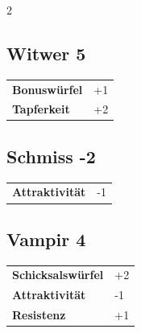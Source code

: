 \begin{multicols}{2}
\begin{tcolorbox}
    \subsection*{Witwer \hfill \small{5 }}
    \tcblower




\begin{tabular}{@{}ll@{}}
    \textbf{Bonuswürfel} & +1\\
    \textbf{Tapferkeit} & +2\\
\end{tabular}


\end{tcolorbox}

\begin{tcolorbox}
    \subsection*{Schmiss \hfill \small{-2 }}
    \tcblower




\begin{tabular}{@{}ll@{}}
    \textbf{Attraktivität} & -1\\
\end{tabular}


\end{tcolorbox}

\begin{tcolorbox}
    \subsection*{Vampir \hfill \small{4 }}
    \tcblower




\begin{tabular}{@{}ll@{}}
    \textbf{Schicksalswürfel} & +2\\
    \textbf{Attraktivität} & -1\\
    \textbf{Resistenz} & +1\\
\end{tabular}


\end{tcolorbox}
\end{multicols}
